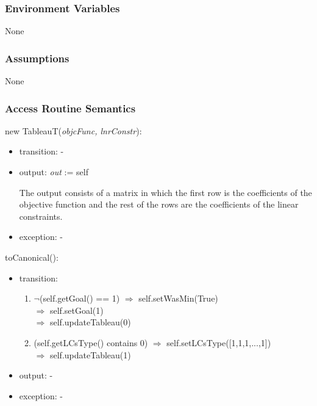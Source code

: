 \documentclass[12pt, titlepage]{article}
\begin{document}


\subsubsection{Environment Variables}

None

\subsubsection{Assumptions}

None

\subsubsection{Access Routine Semantics}

\noindent 
new TableauT(\textit{objcFunc, lnrConstr}):
\begin{itemize}
	\item transition: -
	\item output: \textit{out} := self
	
	The output consists of a matrix in which the first row is the coefficients 
	of the objective function and the rest of the rows are the coefficients of 
	the linear constraints.
	
	\item exception: -
\end{itemize}

\noindent 
toCanonical():
\begin{itemize}
	\item transition: 
		\begin{enumerate}
			\item $\neg$(self.getGoal() == 1) \hspace{4cm} $\Rightarrow$ 
			self.setWasMin(True) \\
			\hspace*{8.3cm} $\Rightarrow$ self.setGoal(1) \\
			\hspace*{8.3cm} $\Rightarrow$ self.updateTableau(0)
			\item (self.getLCsType() contains 0) \hspace{2.65cm} $\Rightarrow$ 
			self.setLCsType([1,1,1,...,1]) \\
			\hspace*{8.3cm} $\Rightarrow$ self.updateTableau(1)
		\end{enumerate}
	\item output: -
	\item exception: -
\end{itemize}
\end{document}
